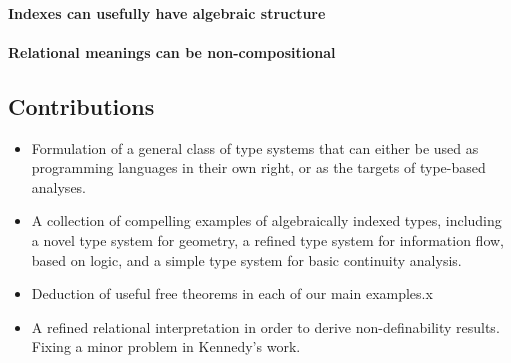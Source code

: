 \paragraph{Indexes can usefully have algebraic structure}

\paragraph{Relational meanings can be non-compositional}

\subsection{Contributions}
\label{sec:contributions}

\begin{itemize}
\item Formulation of a general class of type systems that can either
  be used as programming languages in their own right, or as the
  targets of type-based analyses.
\item A collection of compelling examples of algebraically indexed
  types, including a novel type system for geometry, a refined type
  system for information flow, based on logic, and a simple type
  system for basic continuity analysis.
\item Deduction of useful free theorems in each of our main examples.x
\item A refined relational interpretation in order to derive
  non-definability results. Fixing a minor problem in Kennedy's work.
\end{itemize}

